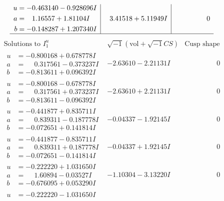 \documentclass[1p]{elsarticle_modified}
\theoremstyle{definition}
\newcommand{\I}{\sqrt{-1}}
\begin{document}
$$\begin{array}{c|c|c}
\begin{aligned}
u &= -0.463140 - 0.928696 I \\
a &= \phantom{-}1.16557 + 1.81104 I \\
b &= -0.148287 + 1.207340 I\end{aligned}
 & \phantom{-}3.41518 + 5.11949 I & \phantom{-0.000000 } 0\\
 \hline 
 \end{array}$$\newpage$$\begin{array}{c|c|c}  
\text{Solutions to }I^u_{1}& \I (\text{vol} + \sqrt{-1}CS) & \text{Cusp shape}\\
 \hline 
\begin{aligned}
u &= -0.800168 + 0.678778 I \\
a &= \phantom{-}0.317561 - 0.373237 I \\
b &= -0.813611 + 0.096392 I\end{aligned}
 & -2.63610 - 2.21131 I & \phantom{-0.000000 } 0 \\ \hline\begin{aligned}
u &= -0.800168 - 0.678778 I \\
a &= \phantom{-}0.317561 + 0.373237 I \\
b &= -0.813611 - 0.096392 I\end{aligned}
 & -2.63610 + 2.21131 I & \phantom{-0.000000 } 0 \\ \hline\begin{aligned}
u &= -0.441877 + 0.835711 I \\
a &= \phantom{-}0.839311 - 0.187778 I \\
b &= -0.072651 + 0.141814 I\end{aligned}
 & -0.04337 - 1.92145 I & \phantom{-0.000000 } 0 \\ \hline\begin{aligned}
u &= -0.441877 - 0.835711 I \\
a &= \phantom{-}0.839311 + 0.187778 I \\
b &= -0.072651 - 0.141814 I\end{aligned}
 & -0.04337 + 1.92145 I & \phantom{-0.000000 } 0 \\ \hline\begin{aligned}
u &= -0.222220 + 1.031650 I \\
a &= \phantom{-}1.60894 - 0.03527 I \\
b &= -0.676095 + 0.053290 I\end{aligned}
 & -1.10304 - 3.13220 I & \phantom{-0.000000 } 0 \\ \hline\begin{aligned}
u &= -0.222220 - 1.031650 I \\

\end{aligned}
\end{array}$$
\end{document}

